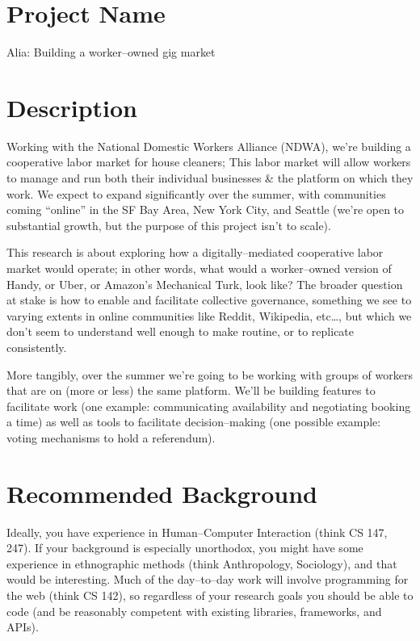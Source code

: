 \documentclass[12pt]{article}
\begin{document}
\section*{Project Name}

Alia: Building a worker--owned gig market

\section*{Description}

Working with the National Domestic Workers Alliance (NDWA),
we're building a cooperative labor market for house cleaners;
This labor market will allow workers to
manage and run both
their individual businesses \&
the platform on which they work.
We expect to expand significantly over the summer,
with communities coming ``online'' in
the SF Bay Area,
New York City,
and Seattle
(we're open to substantial growth,
but the purpose of this project isn't to scale).

This research is about exploring how a digitally--mediated cooperative labor market
would operate; in other words, what would a worker--owned version of
Handy,
or Uber,
or Amazon's Mechanical Turk,
look like?
The broader question at stake is how to enable and facilitate
collective governance,
something we see to varying extents in online communities like
Reddit, Wikipedia, etc\dots,
but which we don't seem to understand well enough to make routine,
or to replicate consistently.

More tangibly,
over the summer we're going to be working with
groups of workers that are on (more or less) the same platform.
We'll be building features to facilitate work
(one example:
communicating availability and negotiating booking a time)
as well as tools to facilitate decision--making
(one possible example:
voting mechanisms to hold a referendum).

\section*{Recommended Background}

Ideally, you have experience in
Human--Computer Interaction
(think CS 147, 247).
If your background is especially unorthodox,
you might have some experience in ethnographic methods
(think Anthropology, Sociology),
and that would be interesting.
Much of the day--to--day work will involve programming for the web
(think CS 142),
so regardless of your research goals you should be able to code
(and be reasonably competent with existing libraries, frameworks, and APIs).
\end{document}
